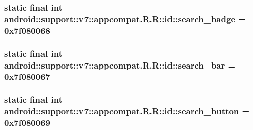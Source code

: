 \hypertarget{classandroid_1_1support_1_1v7_1_1appcompat_1_1_r_1_1id_2006e8ee7e7fc3380774fd55f1d7df15}{
\subsubsection[{search\_\-badge}]{\setlength{\rightskip}{0pt plus 5cm}static final int android::support::v7::appcompat.R.R::id::search\_\-badge = 0x7f080068}}
\label{classandroid_1_1support_1_1v7_1_1appcompat_1_1_r_1_1id_2006e8ee7e7fc3380774fd55f1d7df15}


\hypertarget{classandroid_1_1support_1_1v7_1_1appcompat_1_1_r_1_1id_adcc9b5a8fad146ac21318fd70f0a0f7}{
\subsubsection[{search\_\-bar}]{\setlength{\rightskip}{0pt plus 5cm}static final int android::support::v7::appcompat.R.R::id::search\_\-bar = 0x7f080067}}
\label{classandroid_1_1support_1_1v7_1_1appcompat_1_1_r_1_1id_adcc9b5a8fad146ac21318fd70f0a0f7}


\hypertarget{classandroid_1_1support_1_1v7_1_1appcompat_1_1_r_1_1id_c5e3ddcdb8338d20872f87e8d5d6e4ae}{
\subsubsection[{search\_\-button}]{\setlength{\rightskip}{0pt plus 5cm}static final int android::support::v7::appcompat.R.R::id::search\_\-button = 0x7f080069}}
\label{classandroid_1_1support_1_1v7_1_1appcompat_1_1_r_1_1id_c5e3ddcdb8338d20872f87e8d5d6e4ae}


